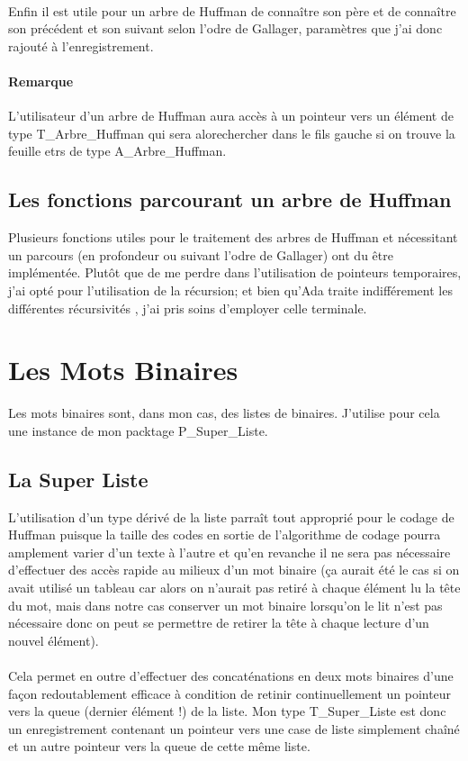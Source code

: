 \documentclass{book}
\begin{document}
\paragraph{}
Enfin il est utile pour un arbre de Huffman de conna\^{i}tre son père et de conna\^{i}tre son précédent et son suivant selon l'odre de Gallager, paramètres que j'ai donc rajouté à l'enregistrement.
\paragraph{Remarque}
L'utilisateur d'un arbre de Huffman aura accès à un pointeur vers un élément de type T\_Arbre\_Huffman qui sera alorechercher dans le fils gauche si on trouve la feuille etrs de type A\_Arbre\_Huffman.

\subsection{Les fonctions parcourant un arbre de Huffman}
Plusieurs fonctions utiles pour le traitement des arbres de Huffman et nécessitant un parcours (en profondeur ou suivant l'odre de Gallager) ont du être implémentée. Plutôt que de me perdre dans l'utilisation de pointeurs temporaires, j'ai opté pour l'utilisation de la récursion; et bien qu'Ada traite indifférement les différentes récursivités , j'ai pris soins d'employer celle terminale.

\section{Les Mots Binaires}
Les mots binaires sont, dans mon cas, des listes de binaires. J'utilise pour cela une instance de mon packtage P\_Super\_Liste.

\subsection{La Super Liste}
L'utilisation d'un type dérivé de la liste parraît tout approprié pour le codage de Huffman puisque la taille des codes en sortie de l'algorithme de codage pourra amplement varier d'un texte à l'autre et qu'en revanche il ne sera pas nécessaire d'effectuer des accès rapide au milieux d'un mot binaire (ça aurait été le cas si on avait utilisé un tableau car alors on n'aurait pas retiré à chaque élément lu la t\^{e}te du mot, mais dans notre cas conserver un mot binaire lorsqu'on le lit n'est pas nécessaire donc on peut se permettre de retirer la t\^{e}te à chaque lecture d'un nouvel élément).
\paragraph{}
Cela permet en outre d'effectuer des concaténations en deux mots binaires d'une façon redoutablement efficace à condition de retinir continuellement un pointeur vers la queue (dernier élément !) de la liste. Mon type T\_Super\_Liste est donc un enregistrement contenant un pointeur vers une case de liste simplement cha\^{i}né et un autre pointeur vers la queue de cette m\^{e}me liste.
\end{document}
